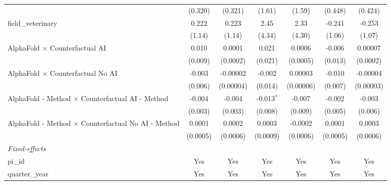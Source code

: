 \begin{tabular}{lcccccc}
                                                               & (0.320)        & (0.321)        & (1.61)         & (1.59)         & (0.448)        & (0.424)\\   
   field\_veterinary                                           & 0.222          & 0.223          & 2.45           & 2.33           & -0.241         & -0.253\\   
                                                               & (1.14)         & (1.14)         & (4.34)         & (4.30)         & (1.06)         & (1.07)\\   
   AlphaFold $\times$ Counterfactual AI                        & 0.010          & 0.0001         & 0.021          & 0.0006         & -0.006         & 0.00007\\   
                                                               & (0.009)        & (0.0002)       & (0.021)        & (0.0005)       & (0.013)        & (0.0002)\\   
   AlphaFold $\times$ Counterfactual No AI                     & -0.003         & -0.00002       & -0.002         & 0.00003        & -0.010         & -0.00004\\   
                                                               & (0.006)        & (0.00004)      & (0.014)        & (0.00006)      & (0.007)        & (0.00003)\\   
   AlphaFold - Method $\times$ Counterfactual AI - Method      & -0.004         & -0.004         & -0.013$^{*}$   & -0.007         & -0.002         & -0.003\\   
                                                               & (0.003)        & (0.003)        & (0.008)        & (0.009)        & (0.005)        & (0.006)\\   
   AlphaFold - Method $\times$ Counterfactual No AI - Method   & 0.0001         & 0.0002         & 0.0003         & -0.0002        & 0.0001         & 0.0003\\   
                                                               & (0.0005)       & (0.0006)       & (0.0009)       & (0.0006)       & (0.0005)       & (0.0006)\\   
   \midrule
   \emph{Fixed-effects}\\
   pi\_id                                                      & Yes            & Yes            & Yes            & Yes            & Yes            & Yes\\  
   quarter\_year                                               & Yes            & Yes            & Yes            & Yes            & Yes            & Yes\\  

\end{tabular}
